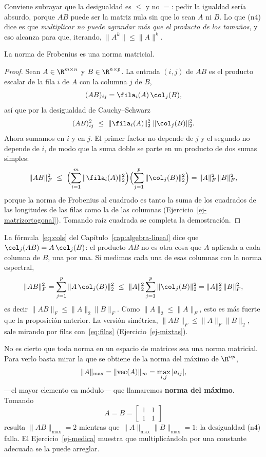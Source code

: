 Conviene subrayar que la desigualdad es $\le$ y no $=$: pedir la igualdad
sería absurdo, porque $AB$ puede ser la matriz nula sin que lo sean $A$ ni
$B$. Lo que (n4) dice es que \emph{multiplicar no puede agrandar más que el
producto de los tamaños}, y eso alcanza para que, iterando,
$\|A^k\|\le\|A\|^k$.

\begin{prop}\label{prop:frobenius-matricial}
    La norma de Frobenius es una norma matricial.
\end{prop}

\begin{proof}
Sean $A\in\R^{m\times n}$ y $B\in\R^{n\times p}$. La entrada $(i,j)$ de $AB$ es
el producto escalar de la fila $i$ de $A$ con la columna $j$ de $B$,
\[
(AB)_{ij}=\fila_i(A)\,\col_j(B) ,
\]
así que por la desigualdad de Cauchy--Schwarz
\[
(AB)_{ij}^2\ \le\ \|\fila_i(A)\|_2^2\;\|\col_j(B)\|_2^2 .
\]
Ahora sumamos en $i$ y en $j$. El primer factor no depende de $j$ y el segundo
no depende de $i$, de modo que la suma doble se parte en un producto de dos
sumas simples:
\[
\|AB\|_F^2\ \le\ \Bigl(\sum_{i=1}^{m}\|\fila_i(A)\|_2^2\Bigr)
\Bigl(\sum_{j=1}^{p}\|\col_j(B)\|_2^2\Bigr)=\|A\|_F^2\,\|B\|_F^2 ,
\]
porque la norma de Frobenius al cuadrado es tanto la suma de los cuadrados de
las longitudes de las filas como la de las columnas
(Ejercicio~\ref{ej-matrizortogonal}). Tomando raíz cuadrada se completa la
demostración.
\end{proof}

\begin{remark}\label{obs:frob-por-columnas}
La fórmula~\eqref{eq:cols} del Capítulo~\ref{cap:algebra-lineal} dice que
$\col_j(AB)=A\,\col_j(B)$: el producto $AB$ no es otra cosa que $A$ aplicada a
cada columna de $B$, una por una. Si medimos cada una de esas columnas con la
norma espectral,
\[
\|AB\|_F^2=\sum_{j=1}^{p}\|A\,\col_j(B)\|_2^2
\ \le\ \|A\|_2^2\sum_{j=1}^{p}\|\col_j(B)\|_2^2=\|A\|_2^2\,\|B\|_F^2 ,
\]
es decir $\|AB\|_F\le\|A\|_2\|B\|_F$. Como $\|A\|_2\le\|A\|_F$, esto es más
fuerte que la proposición anterior. La versión simétrica,
$\|AB\|_F\le\|A\|_F\|B\|_2$, sale mirando por filas
con~\eqref{eq:filas} (Ejercicio~\ref{ej-mixtas}).
\end{remark}

No es cierto que toda norma en un espacio de matrices sea una norma
matricial. Para verlo basta mirar la que se obtiene de la norma del máximo de
$\R^{np}$,
\[
\|A\|_{\max}=\|\textup{vec}(A)\|_\infty=\max_{i,j}|a_{ij}| ,
\]
---el mayor elemento en módulo--- que llamaremos \textbf{norma del máximo}.
Tomando
\[
A=B=\begin{bmatrix}
1 & 1 \\
1 & 1
\end{bmatrix}
\]
resulta $\|AB\|_{\max}=2$ mientras que $\|A\|_{\max}\|B\|_{\max}=1$: la
desigualdad (n4) falla. El Ejercicio~\ref{ej-medica} muestra que
multiplicándola por una constante adecuada se la puede arreglar.


